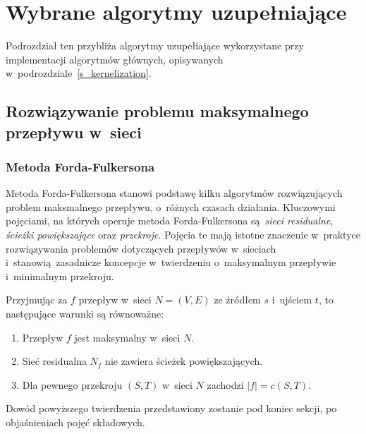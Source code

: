 \section{Wybrane algorytmy uzupełniające}\label{s_supplementary_algorithms}
\par{
  Podrozdział ten przybliża algorytmy uzupełiające wykorzystane przy 
  implementacji algorytmów głównych, opisywanych 
  w~podrozdziale~\ref{s_kernelization}.
}

\subsection{Rozwiązywanie problemu maksymalnego przepływu w~sieci}\label{ss_max_flow}
\subsubsection{\textbf{Metoda Forda-Fulkersona}}
\par{
  Metoda Forda-Fulkersona stanowi podstawę kilku algorytmów rozwiązujących problem maksmalnego przepływu, o~różnych czasach działania.
  Kluczowymi pojęciami, na których operuje metoda Forda-Fulkersona są \emph{sieci residualne}, \emph{ścieżki powiększające} oraz \emph{przekroje}.
  Pojęcia te mają istotne znaczenie w~praktyce rozwiązywania problemów dotyczących przepływów w~sieciach i~stanowią zasadnicze koncepcje w~twierdzeniu o~maksymalnym przepływie i~minimalnym przekroju.
  \begin{theorem}
    Przyjmując za $f$ przepływ w~sieci $N=(V,E)$ ze źródłem $s$ i~ujściem $t$, to następujące warunki są równoważne:
    \begin{enumerate}
      \item Przepływ $f$ jest maksymalny w~sieci $N$.
      \item Sieć residualna $N_f$ nie zawiera ścieżek powiększających.
      \item Dla pewnego przekroju $(S, T)$ w~sieci $N$ zachodzi $|f|=c(S,T)$.
    \end{enumerate}
  \end{theorem}
  Dowód powyższego twierdzenia przedstawiony zostanie pod koniec sekcji, po objaśnieniach pojęć składowych.
}
